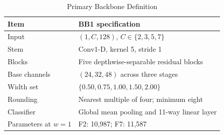 \begin{table}[!t]
\caption{Primary Backbone Definition}
\label{tab:backbone-definition}
\centering
\footnotesize
\setlength{\tabcolsep}{1pt}
\begin{tabular}{@{}>{\raggedright\arraybackslash}p{}>{\raggedright\arraybackslash}p{}@{}}
\toprule
Item & BB1 specification \\
\midrule
Input & $(1,C,128)$, $C\in\{2,3,5,7\}$ \\
Stem & Conv1-D, kernel 5, stride 1 \\
Blocks & Five depthwise-separable residual blocks \\
Base channels & $(24,32,48)$ across three stages \\
Width set & $\{0.50,0.75,1.00,1.50,2.00\}$ \\
Rounding & Nearest multiple of four; minimum eight \\
Classifier & Global mean pooling and 11-way linear layer \\
Parameters at $w=1$ & F2: 10,987; F7: 11,587 \\
\bottomrule
\end{tabular}
\end{table}
